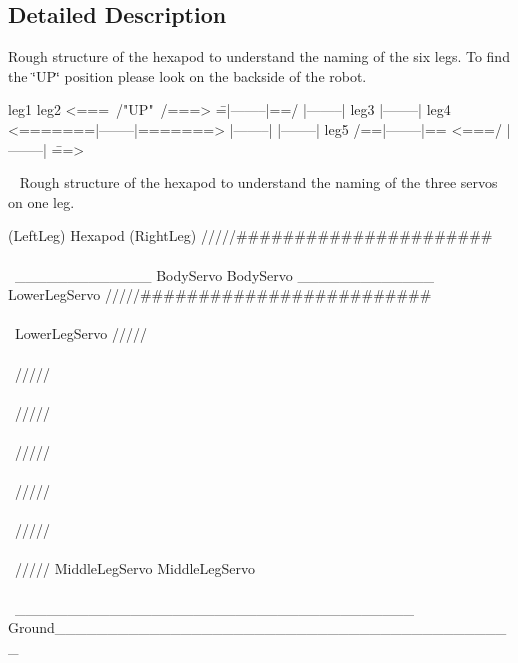 \subsection{Detailed Description}
Rough structure of the hexapod to understand the naming of the six legs. To find the \char`\"{}\+U\+P\char`\"{} position please look on the backside of the robot. 
\begin{DoxyPre}
\begin{DoxyVerb}leg1                  leg2
<===\     /"UP"\     /===>
     \==|--------|==/
        |--------|
leg3    |--------|  leg4
<=======|--------|=======>
        |--------|
        |--------|
leg5 /==|--------|==
<===/   |--------|   \===>
\end{DoxyVerb}

\end{DoxyPre}
 ~\newline
Rough structure of the hexapod to understand the naming of the three servos on one leg. \begin{DoxyVerb}         (LeftLeg)                      Hexapod                          (RightLeg) 
                            /////######################\\\\\        
       _____________     BodyServo                   BodyServo          _____________
       LowerLegServo      /////#########################\\\\\           LowerLegServo
     /////      \\\\\    /////                           \\\\\        /////      \\\\\
    /////        \\\\\  /////                             \\\\\      /////        \\\\\
   /////        MiddleLegServo                             MiddleLegServo          \\\\\
____\/__________________________________ Ground______________________________________\/______                                                            
\end{DoxyVerb}
 

